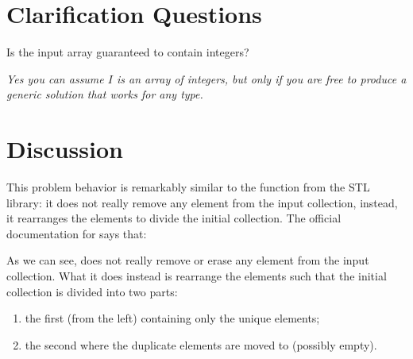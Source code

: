 \section{Clarification Questions}

\begin{QandA}
	\item \begin{questionitem} \begin{question} Is the input array guaranteed to contain integers?   \end{question} 	 
    \begin{answered}
		\textit{Yes you can assume $I$ is an array of integers, but only if you are free to produce a generic solution that works for any type.}
	\end{answered} \end{questionitem}	
\end{QandA}

\section{Discussion}
\label{remove_duplicated_sorted_array_inplace:sec:discussion}
This problem behavior is remarkably similar to the function  from the STL library: it does not really remove any element from the input collection, instead, it rearranges the elements to divide the initial collection. 
The official documentation for  says that:


As we can see,  does not really remove or erase any element from the input collection. 
What it does instead is rearrange the elements such that the initial collection is divided into
two parts:
\begin{enumerate}
	\item the first (from the left) containing only the unique elements;
	\item the second where the duplicate elements are moved to (possibly empty).
\end{enumerate}


